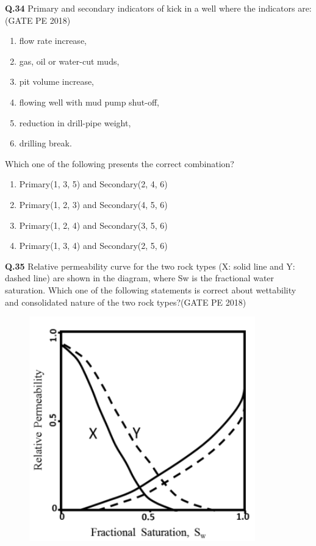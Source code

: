 \documentclass[journal,12pt,onecolumn]{IEEEtran}
\theoremstyle{remark}
\begin{document}
\noindent\textbf{Q.34} Primary and secondary indicators of kick in a well where the indicators are: \hfill (GATE PE 2018)

\begin{enumerate}
\item flow rate increase,
\item gas, oil or water-cut muds,
\item pit volume increase,
\item flowing well with mud pump shut-off,
\item reduction in drill-pipe weight,
\item drilling break.
\end{enumerate}
\noindent
Which one of the following presents the correct combination?


\begin{enumerate}[label=(\Alph*)] 

\item Primary(1, 3, 5) and Secondary(2, 4, 6) 
\item Primary(1, 2, 3) and Secondary(4, 5, 6) 
\item Primary(1, 2, 4) and Secondary(3, 5, 6) 
\item Primary(1, 3, 4) and Secondary(2, 5, 6) 

\end{enumerate}
\pagebreak
\noindent
\textbf{Q.35} Relative permeability curve for the two rock types (X: solid line and Y: dashed line) are
shown in the diagram, where Sw is the fractional water saturation. Which one of the
following statements is correct about wettability and consolidated nature of the two rock
types?\hfill(GATE PE 2018)

\begin{figure}[h!]
  \centering
  \includegraphics[width=0.5\columnwidth]{pic11.png} 
\end{figure}
\end{document}
